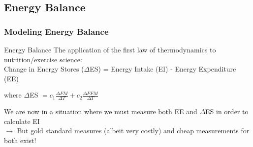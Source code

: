 \documentclass[handout]{beamer}\usepackage[]{graphicx}\usepackage[]{color}
\begin{document}
\subsection{Energy Balance}
\begin{frame}
\frametitle{Modeling Energy Balance}

\begin{block}{Energy Balance}
The application of the first law of thermodynamics to nutrition/exercise science: \\
Change in Energy Stores ($\Delta$ES) = Energy Intake (EI) - Energy Expenditure (EE)
\end{block}

where $\Delta$ES $= c_1 \frac{\Delta FM}{\Delta T } + c_2 \frac{\Delta FFM}{\Delta T}$  



\vspace{0.3cm}

We are now in a situation where we must measure both EE and $\Delta$ES in order to calculate EI \\

$\rightarrow$ But gold standard measures (albeit very costly) and cheap measurements for both exist! 


\end{frame}

% 
% 
% 
% 
% 
\end{document}
